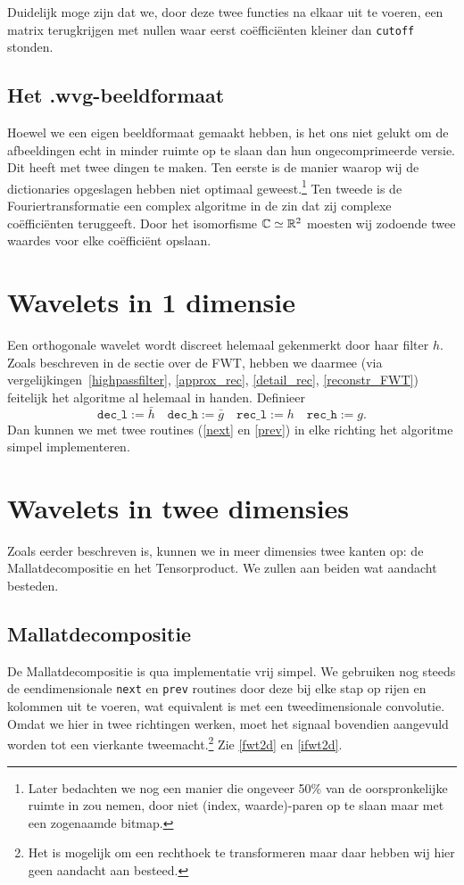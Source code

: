 Duidelijk moge zijn dat we, door deze twee functies na elkaar uit te voeren, een matrix terugkrijgen met nullen waar eerst co\"effici\"enten kleiner dan \texttt{cutoff} stonden.

\subsection{Het .wvg-beeldformaat}
Hoewel we een eigen beeldformaat gemaakt hebben, is het ons niet gelukt om de afbeeldingen echt in minder ruimte op te slaan dan hun ongecomprimeerde versie. Dit heeft met twee dingen te maken. Ten eerste is de manier waarop wij de dictionaries opgeslagen hebben niet optimaal geweest.\footnote{Later bedachten we nog een manier die ongeveer 50\% van de oorspronkelijke ruimte in zou nemen, door niet (index, waarde)-paren op te slaan maar met een zogenaamde bitmap.} Ten tweede is de Fouriertransformatie een complex algoritme in de zin dat zij complexe co\"effici\"enten teruggeeft. Door het isomorfisme $\mathbb{C} \simeq \mathbb{R}^2$ moesten wij zodoende twee waardes voor elke co\"effici\"ent opslaan.

\section{Wavelets in 1 dimensie}
Een orthogonale wavelet wordt discreet helemaal gekenmerkt door haar filter $h$. Zoals beschreven in de sectie over de FWT, hebben we daarmee (via vergelijkingen~\ref{highpassfilter}, \ref{approx_rec}, \ref{detail_rec}, \ref{reconstr_FWT}) feitelijk het algoritme al helemaal in handen. Definieer
\[
	\texttt{dec\_l} := \bar{h} \quad \texttt{dec\_h} := \bar{g} \quad 
        \texttt{rec\_l} := h \quad \texttt{rec\_h} := g.
\]
Dan kunnen we met twee routines (\autoref{next} en \autoref{prev}) in elke richting het algoritme simpel implementeren.

\section{Wavelets in twee dimensies}
Zoals eerder beschreven is, kunnen we in meer dimensies twee kanten op: de Mallatdecompositie en het Tensorproduct.
We zullen aan beiden wat aandacht besteden.

\subsection{Mallatdecompositie}
De Mallatdecompositie is qua implementatie vrij simpel. 
We gebruiken nog steeds de eendimensionale \texttt{next} en \texttt{prev} routines 
door deze bij elke stap op rijen en kolommen uit te voeren, wat equivalent is met een tweedimensionale convolutie.
Omdat we hier in twee richtingen werken, moet het signaal bovendien aangevuld worden tot een vierkante tweemacht.\footnote{Het is mogelijk om een rechthoek te transformeren maar daar hebben wij hier geen aandacht aan besteed.} Zie \autoref{fwt2d} en \autoref{ifwt2d}.


